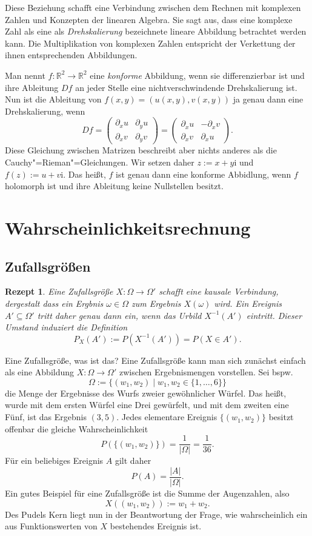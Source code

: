 \documentclass[a4paper,10pt,fleqn,twocolumn,twoside,dvipdfmx]{scrartcl}
\theoremstyle{rmbox}
\newtheorem{Rezept}{Rezept}[section]
\newcommand{\ui}{\mathrm{i}}
\newcommand{\R}{\mathbb R}
\begin{document}
Diese Beziehung schafft eine Verbindung zwischen dem
Rechnen mit komplexen Zahlen und Konzepten der linearen Algebra.
Sie sagt aus, dass eine komplexe Zahl als eine als \emph{Drehskalierung}
bezeichnete lineare Abbildung betrachtet werden kann. Die Multiplikation
von komplexen Zahlen entspricht der Verkettung der ihnen entsprechenden
Abbildungen.

Man nennt $f\colon\R^2\to\R^2$ eine \emph{konforme} Abbildung, wenn sie
differenzierbar ist und ihre Ableitung $Df$ an jeder Stelle
eine nichtverschwindende Drehskalierung ist. Nun ist die
Ableitung von $f(x,y)=(u(x,y),v(x,y))$ ja genau dann eine
Drehskalierung, wenn
\[Df = \begin{pmatrix}
\partial_x u & \partial_y u\\
\partial_x v & \partial_y v
\end{pmatrix} = \begin{pmatrix}
\partial_x u & -\partial_x v\\
\partial_x v & \partial_x u
\end{pmatrix}.\]
Diese Gleichung zwischen Matrizen beschreibt aber nichts anderes als
die Cauchy"=Rieman"=Gleichungen. Wir setzen daher $z:=x+y\ui$ und
$f(z):=u+v\ui$. Das heißt, $f$ ist genau dann eine konforme
Abbidlung, wenn $f$ holomorph ist und ihre Ableitung keine
Nullstellen besitzt.


\section{Wahrscheinlichkeitsrechnung}

\subsection{Zufallsgrößen}

\begin{Rezept}
Eine Zufallsgröße $X\colon\Omega\to\Omega'$ schafft eine kausale
Verbindung, dergestalt dass ein Ergbnis $\omega\in\Omega$ zum
Ergebnis $X(\omega)$ wird. Ein Ereignis $A'\subseteq\Omega'$
tritt daher genau dann ein, wenn das Urbild $X^{-1}(A')$ eintritt.
Dieser Umstand induziert die Definition
\[P_X(A') := P(X^{-1}(A')) = P(X\in A').\]
\end{Rezept}

\noindent
Eine Zufallsgröße, was ist das? Eine Zufallsgröße kann man sich
zunächst einfach als eine Abbildung $X\colon\Omega\to\Omega'$ zwischen
Ergebnismengen vorstellen. Sei bspw.
\[\Omega := \{(w_1,w_2)\mid w_1,w_2\in\{1,\ldots,6\}\}\]
die Menge der Ergebnisse des Wurfs zweier gewöhnlicher
Würfel. Das heißt, wurde mit dem ersten Würfel eine Drei
gewürfelt, und mit dem zweiten eine Fünf, ist das Ergebnis $(3, 5)$.
Jedes elementare Ereignis $\{(w_1,w_2)\}$ besitzt offenbar
die gleiche Wahrscheinlichkeit%
\[P(\{(w_1,w_2)\}) = \frac{1}{|\Omega|} = \frac{1}{36}.\]
Für ein beliebiges Ereignis $A$ gilt daher%
\[P(A) = \frac{|A|}{|\Omega|}.\]
Ein gutes Beispiel für eine Zufallsgröße ist die Summe der
Augenzahlen, also%
\[X((w_1,w_2)) := w_1 + w_2.\]
Des Pudels Kern liegt nun in der Beantwortung der Frage, wie
wahrscheinlich ein aus Funktionswerten von $X$ bestehendes
Ereignis ist.
\end{document}

